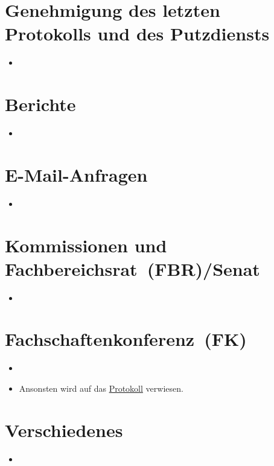 \documentclass[sitzung=fsr]{fsphys-protokoll}
\begin{document}
\section{Genehmigung des letzten Protokolls und des Putzdiensts}
\begin{itemize}
	\item 
\end{itemize}

\section{Berichte}
\begin{itemize}
	\item 
\end{itemize}

\section{E-Mail-Anfragen}
\begin{itemize}
	\item 
\end{itemize}

\section{Kommissionen und Fachbereichsrat~(FBR)/Senat}
\begin{itemize}
	\item 
\end{itemize}

\section{Fachschaftenkonferenz~(FK)}
\begin{itemize}
	\item 
	\item Ansonsten wird auf das \href{http://www.asta.ms/hochschulpolitik/hochschulpolitik/fachschaften/fk-protokolle}{Protokoll} verwiesen.
\end{itemize}

\section{Verschiedenes}
\begin{itemize}
	\item 
\end{itemize}
\end{document}
